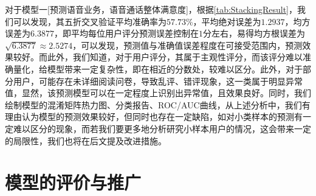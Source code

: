 \documentclass{MathorCupmodeling}
\begin{document}
	对于模型一[预测语音业务，语音通话整体满意度]，根据\textcolor{blue}{\cref{tab:StackingResult}}，我们可以发现，其五折交叉验证平均准确率为$57.73\%$，平均绝对误差为$1.2937$，均方误差为$6.3877$，即平均每位用户评分预测误差控制在$1$分左右，易得均方根误差为$\sqrt{6.3877}\approx2.5274$，可以发现，预测值与准确值误差程度在可接受范围内，预测效果较好。而此外，我们知道，对于用户评分，其属于主观性评分，而该评分难以准确量化，给模型带来一定复杂性，即在相近的分数处，较难以区分。此外，对于部分用户，可能存在未详细阅读问卷，导致乱评、错评现象，这一类属于明显异常值，显然，该预测模型可以在一定程度上识别出异常值，且效果良好。同时，我们绘制模型的混淆矩阵热力图、分类报告、ROC/AUC曲线，从上述分析中，我们有理由认为模型的预测效果较好，但同时也存在一定缺陷，如对小类样本的预测有一定难以区分的现象，而若我们要更多地分析研究小样本用户的情况，这会带来一定的局限性，我们也将在后文提及改进措施。
	\section{模型的评价与推广}
\end{document}
